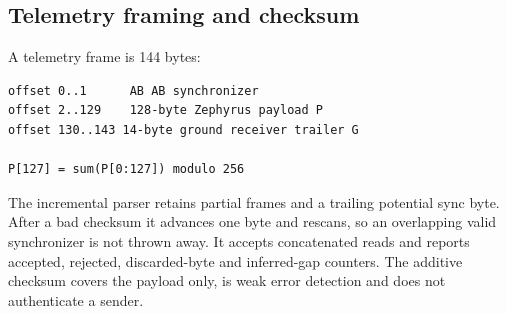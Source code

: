 \subsection{Telemetry framing and checksum}
A telemetry frame is 144 bytes:
\begin{lstlisting}
offset 0..1      AB AB synchronizer
offset 2..129    128-byte Zephyrus payload P
offset 130..143 14-byte ground receiver trailer G

P[127] = sum(P[0:127]) modulo 256
\end{lstlisting}
The incremental parser retains partial frames and a trailing potential sync
byte. After a bad checksum it advances one byte and rescans, so an overlapping
valid synchronizer is not thrown away. It accepts concatenated reads and
reports accepted, rejected, discarded-byte and inferred-gap counters.
The additive checksum covers the payload only, is weak error detection and
does not authenticate a sender.

